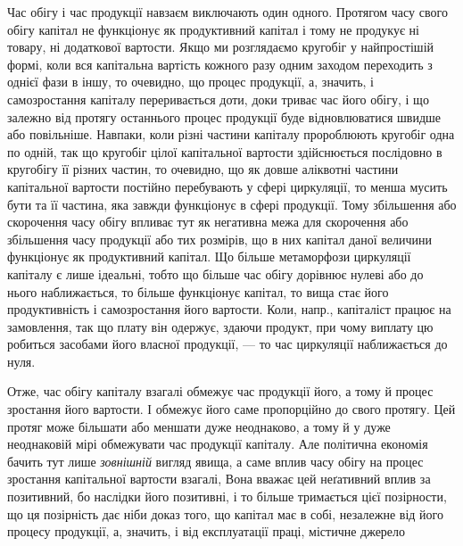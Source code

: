 Час обігу і час продукції навзаєм виключають один одного. Протягом
часу свого обігу капітал не функціонує як продуктивний капітал і тому
не продукує ні товару, ні додаткової вартости. Якщо ми розглядаємо
кругобіг у найпростішій формі, коли вся капітальна вартість кожного разу
одним заходом переходить з однієї фази в іншу, то очевидно, що процес
продукції, а, значить, і самозростання капіталу переривається доти, доки
триває час його обігу, і що залежно від протягу останнього процес продукції
буде відновлюватися швидше або повільніше. Навпаки, коли різні
частини капіталу пророблюють кругобіг одна по одній, так що кругобіг
цілої капітальної вартости здійснюється послідовно в кругобігу її
різних частин, то очевидно, що як довше аліквотні частини капітальної
вартости постійно перебувають у сфері циркуляції, то менша
мусить бути та її частина, яка завжди функціонує в сфері
продукції. Тому збільшення або скорочення часу обігу впливає тут як
негативна межа для скорочення або збільшення часу продукції або тих
розмірів, що в них капітал даної величини функціонує як продуктивний
капітал. Що більше метаморфози циркуляції капіталу є лише ідеальні,
тобто що більше час обігу дорівнює нулеві або до нього наближається,
то більше функціонує капітал, то вища стає його продуктивність і самозростання
його вартости. Коли, напр., капіталіст працює на замовлення, так
що плату він одержує, здаючи продукт, при чому виплату цю робиться
засобами його власної продукції, — то час циркуляції наближається до
нуля.

Отже, час обігу капіталу взагалі обмежує час продукції його, а тому
й процес зростання його вартости. І обмежує його саме пропорційно
до свого протягу. Цей протяг може більшати або меншати дуже неоднаково,
а тому й у дуже неоднаковій мірі обмежувати час
продукції капіталу. Але політична економія бачить тут лише \emph{зовнішній}
вигляд явища, а саме вплив часу обігу на процес зростання капітальної
вартости взагалі, Вона вважає цей неґативний вплив за позитивний, бо
наслідки його позитивні, і то більше тримається цієї позірности, що ця позірність
дає ніби доказ того, що капітал має в собі, незалежне від його
процесу продукції, а, значить, і від експлуатації праці, містичне джерело
\parbreak{}  %
